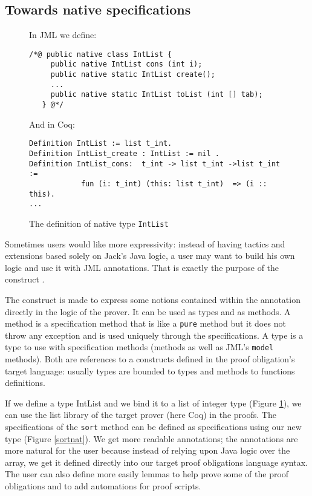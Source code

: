\subsection{Towards native specifications}
\begin{figure}[t!]
{\small In JML we define:
\begin{verbatim}
/*@ public native class IntList {
     public native IntList cons (int i);
     public native static IntList create();
     ...
     public native static IntList toList (int [] tab);
   } @*/ \end{verbatim}}

{\small And in Coq:
\begin{verbatim}
Definition IntList := list t_int.
Definition IntList_create : IntList := nil .  
Definition IntList_cons:  t_int -> list t_int ->list t_int := 
            fun (i: t_int) (this: list t_int)  => (i :: this).
... \end{verbatim}}
\caption{The definition of native type \texttt{IntList}}\label{CoqAnnot} 
\end{figure}
Sometimes users would like more expressivity: instead of having
tactics and extensions based solely on Jack's Java logic, a user may want to
build his own logic and use it with JML annotations. That is 
exactly the purpose of the \native construct \cite{Charles06}.

The \native construct is made to express some notions contained within
the annotation directly in the logic of the prover. It can be used 
as \native types and as  \native methods.
A \native method is a specification method that is like a {\tt pure} method 
but  it does not throw any exception and is used uniquely through the specifications. 
A \native type is a type to use with specification methods (\native methods as well as 
JML's {\tt model} methods). Both are references to a constructs 
defined in the proof obligation's target language: usually \native types are bounded to 
types and \native methods to functions definitions.


If we define a \native type IntList and we bind it to a list of integer type 
 (Figure \ref{CoqAnnot}), we can use the list library of the target prover (here Coq) 
in the proofs. The specifications of the
{\tt sort} method can be defined as specifications using our new type 
(Figure \ref{sortnat}). We get more readable annotations;
the annotations are more natural for the user because instead
 of relying upon Java logic over the array, we get it defined directly into
our target proof obligations language syntax.
The user can also define more easily lemmas to help prove some of the proof
obligations and to add automations for proof scripts.


